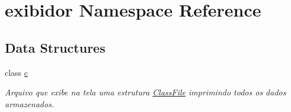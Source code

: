 \hypertarget{namespaceexibidor}{}\section{exibidor Namespace Reference}
\label{namespaceexibidor}
\subsection*{Data Structures}
\begin{DoxyCompactItemize}
\item 
class \hyperlink{classexibidor_1_1c}{c}
\begin{DoxyCompactList}\small\item\em Arquivo que exibe na tela uma estrutura \hyperlink{structClassFile}{Class\+File} imprimindo todos os dados armazenados. \end{DoxyCompactList}\end{DoxyCompactItemize}
